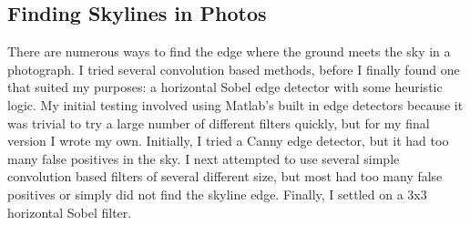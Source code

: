 \documentclass{acm_proc_article-sp}
\begin{document}
\subsection{Finding Skylines in Photos}
    There are numerous ways to find the edge where the ground meets the sky in a photograph.  I tried several convolution based methods, before I finally found one that suited my purposes:  a horizontal Sobel edge detector with some heuristic logic.  My initial testing involved using Matlab’s built in edge detectors \cite{mcandrew2004introduction} because it was trivial to try a large number of different filters quickly, but for my final version I wrote my own.  Initially, I tried a Canny edge detector, but it had too many false positives in the sky.  I next attempted to use several simple convolution \cite{Schafer:DSP} based filters of several different size, but most had too many false positives or simply did not find the skyline edge.  Finally, I settled on a 3x3 horizontal Sobel filter. \cite{behringer2002registration}  
\end{document}
